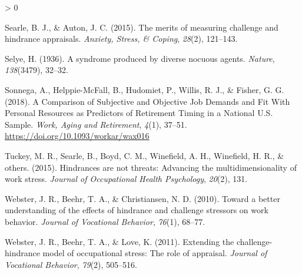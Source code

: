 \documentclass[
  english,
  man]{apa6}
\newlength{\cslhangindent}
\newenvironment{CSLReferences}[2] %
 {%
  \setlength{\parindent}{0pt}
  \ifodd #1 \everypar{\setlength{\hangindent}{\cslhangindent}}\ignorespaces\fi
  \ifnum #2 > 0
  \setlength{\parskip}{#2\baselineskip}
  \fi
 }%
 {}
\begin{document}
\begin{CSLReferences}{1}{0}
\leavevmode\hypertarget{ref-searle2015merits}{}%
Searle, B. J., \& Auton, J. C. (2015). The merits of measuring challenge and hindrance appraisals. \emph{Anxiety, Stress, \& Coping}, \emph{28}(2), 121--143.

\leavevmode\hypertarget{ref-selye1936syndrome}{}%
Selye, H. (1936). A syndrome produced by diverse nocuous agents. \emph{Nature}, \emph{138}(3479), 32--32.

\leavevmode\hypertarget{ref-sonnega_comparison_2018}{}%
Sonnega, A., Helppie-McFall, B., Hudomiet, P., Willis, R. J., \& Fisher, G. G. (2018). A {Comparison} of {Subjective} and {Objective} {Job} {Demands} and {Fit} {With} {Personal} {Resources} as {Predictors} of {Retirement} {Timing} in a {National} {U}.{S}. {Sample}. \emph{Work, Aging and Retirement}, \emph{4}(1), 37--51. \url{https://doi.org/10.1093/workar/wax016}

\leavevmode\hypertarget{ref-tuckey2015hindrances}{}%
Tuckey, M. R., Searle, B., Boyd, C. M., Winefield, A. H., Winefield, H. R., \& others. (2015). Hindrances are not threats: Advancing the multidimensionality of work stress. \emph{Journal of Occupational Health Psychology}, \emph{20}(2), 131.

\leavevmode\hypertarget{ref-webster2010toward}{}%
Webster, J. R., Beehr, T. A., \& Christiansen, N. D. (2010). Toward a better understanding of the effects of hindrance and challenge stressors on work behavior. \emph{Journal of Vocational Behavior}, \emph{76}(1), 68--77.

\leavevmode\hypertarget{ref-webster2011extending}{}%
Webster, J. R., Beehr, T. A., \& Love, K. (2011). Extending the challenge-hindrance model of occupational stress: The role of appraisal. \emph{Journal of Vocational Behavior}, \emph{79}(2), 505--516.

\end{CSLReferences}

\endgroup
\end{document}

